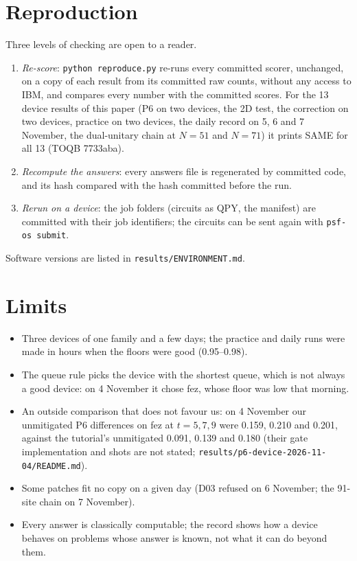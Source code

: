 \documentclass[10pt,a4paper]{article}
\begin{document}
\section{Reproduction}\label{sec:repro}
Three levels of checking are open to a reader.
\begin{enumerate}
\item \emph{Re-score}: \texttt{python reproduce.py} re-runs every committed scorer, unchanged, on a copy of each
result from its committed raw counts, without any access to IBM, and compares every number with the committed
scores. For the 13 device results of this paper (P6 on two devices, the 2D test, the correction on two devices,
practice on two devices, the daily record on 5, 6 and 7 November, the dual-unitary chain at $N = 51$ and $N = 71$) it
prints SAME for all 13 (TOQB 7733aba).
\item \emph{Recompute the answers}: every answers file is regenerated by committed code, and its hash compared with
the hash committed before the run.
\item \emph{Rerun on a device}: the job folders (circuits as QPY, the manifest) are committed with their job
identifiers; the circuits can be sent again with \texttt{psf-os submit}.
\end{enumerate}
Software versions are listed in \texttt{results/ENVIRONMENT.md}.

\section{Limits}
\begin{itemize}
\item Three devices of one family and a few days; the practice and daily runs were made in hours when the floors
were good (0.95--0.98).
\item The queue rule picks the device with the shortest queue, which is not always a good device: on 4 November it
chose fez, whose floor was low that morning.
\item An outside comparison that does not favour us: on 4 November our unmitigated P6 differences on fez at
$t = 5, 7, 9$ were 0.159, 0.210 and 0.201, against the tutorial's unmitigated 0.091, 0.139 and 0.180 (their gate
implementation and shots are not stated; \texttt{results/p6-device-2026-11-04/README.md}).
\item Some patches fit no copy on a given day (D03 refused on 6 November; the 91-site chain on 7 November).
\item Every answer is classically computable; the record shows how a device behaves on problems whose answer is
known, not what it can do beyond them.
\end{itemize}
\end{document}
